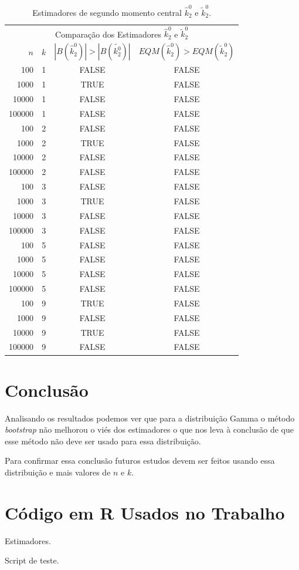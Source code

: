 \documentclass[12pt]{article}
\begin{document}
\begin{table}[H]
  \label{tab:gamma_r_m1}
  \centering
  \begin{tabular}{rccc}
    \toprule
    \multicolumn{4}{c}{Comparação dos Estimadores $\hat{k}_2^0$ e $\tilde{k}_2^0$}\\
    $n$ & $k$ & $|B(\hat{k}_2^0)|>|B(\tilde{k_2^0})|$ & $EQM(\hat{k}_2^0)>EQM(\tilde{k}_2^0)$ \\
    \midrule
    100 & 1 & FALSE & FALSE\\
    1000 & 1 & TRUE & FALSE\\
    10000 & 1 & FALSE & FALSE\\
    100000 & 1 & FALSE & FALSE\\
    100 & 2 & FALSE & FALSE\\
    1000 & 2 & TRUE & FALSE\\
    10000 & 2 & FALSE & FALSE\\
    100000 & 2 & FALSE & FALSE\\
    100 & 3 & FALSE & FALSE\\
    1000 & 3 & TRUE & FALSE\\
    10000 & 3 & FALSE & FALSE\\
    100000 & 3 & FALSE & FALSE\\
    100 & 5 & FALSE & FALSE\\
    1000 & 5 & FALSE & FALSE\\
    10000 & 5 & FALSE & FALSE\\
    100000 & 5 & FALSE & FALSE\\
    100 & 9 & TRUE & FALSE\\
    1000 & 9 & FALSE & FALSE\\
    10000 & 9 & TRUE & FALSE\\
    100000 & 9 & FALSE & FALSE\\
    \bottomrule
  \end{tabular}
  \caption{Estimadores de segundo momento central $\hat{k}_2^0$ e $\tilde{k}_2^0$.}
\end{table}

\section{Conclusão}

Analisando os resultados podemos ver que para a distribuição Gamma
o método \textit{bootstrap} não melhorou o viés dos estimadores o que
nos leva à conclusão de que esse método não deve ser usado para essa
distribuição.

Para confirmar essa conclusão futuros estudos devem ser feitos usando essa
distribuição e mais valores de $n$ e $k$.

\newpage
\appendix
\section{Código em R Usados no Trabalho}

Estimadores.



Script de teste.


\end{document}
